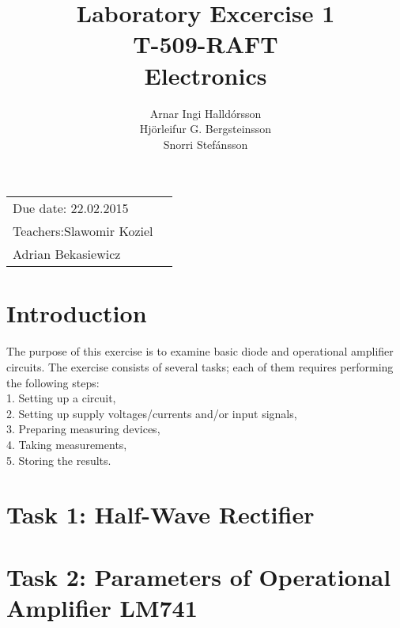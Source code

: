 \documentclass[11pt,a4paper]{article}
\title{Laboratory Excercise 1 \\ T-509-RAFT \\ Electronics} %
\author{Arnar Ingi Halldórsson \\ Hjörleifur G. Bergsteinsson \\ Snorri Stefánsson} %
\begin{document}
\maketitle %

\begin{tabular}{lr}
    Due date: 22.02.2015 \\
    Teachers:\qquad Slawomir Koziel\\ %
\qquad \qquad \qquad Adrian Bekasiewicz
\end{tabular}

\setlength\parindent{0pt} %

\renewcommand{\labelenumi}{\alph{enumi}.} %

\section*{Introduction}

    The  purpose  of  this  exercise  is to  examine  basic  diode  and  operational  amplifier  circuits. The exercise consists of several tasks; each of them requires performing the following steps:\\
        1. Setting up a circuit,\\
        2. Setting up supply voltages/currents and/or input signals, \\
        3. Preparing measuring devices, \\
        4. Taking measurements, \\
        5. Storing the results. \\

\pagebreak

\section*{Task 1: Half-Wave Rectifier}
    
\pagebreak
\section*{Task 2: Parameters of Operational Amplifier LM741}
    
\end{document}
